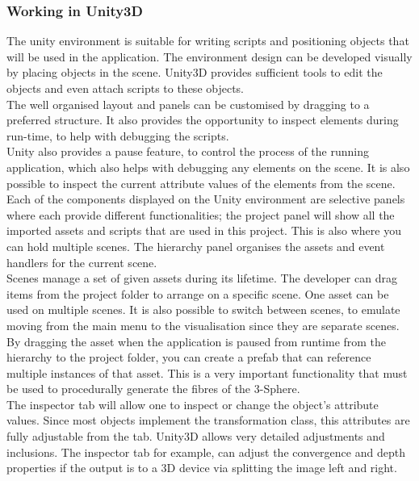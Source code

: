 \documentclass[12pt]{article} %
\begin{document}
\begin{flushleft}
\subsubsection{Working in Unity3D} %
The unity environment is suitable for writing scripts and positioning objects that will be used in the application. The environment design can be developed visually by placing objects in the scene. Unity3D provides sufficient tools to edit the objects and even attach scripts to these objects.  \\
The well organised layout and panels can be customised by dragging to a preferred structure. It also provides the opportunity to inspect elements during run-time, to help with debugging the scripts.\\
Unity also provides a pause feature, to control the process of the running application, which also helps with debugging any elements on the scene. It is also possible to inspect the current attribute values of the elements from the scene.\\
Each of the components displayed on the Unity environment are selective panels where each provide different functionalities; the project panel will show all the imported assets and scripts that are used in this project. This is also where you can hold multiple scenes. The hierarchy panel organises the assets and event handlers for the current scene.\\
Scenes manage a set of given assets during its lifetime. The developer can drag items from the project folder to arrange on a specific scene. One asset can be used on multiple scenes. It is also possible to switch between scenes, to emulate moving from the main menu to the visualisation since they are separate scenes.\\
By dragging the asset when the application is paused from runtime from the hierarchy to the project folder, you can create a prefab that can reference multiple instances of that asset. This is a very important functionality that must be used to procedurally generate the fibres of the 3-Sphere.\\
The inspector tab will allow one to inspect or change the object’s attribute values. Since most objects implement the transformation class, this attributes are fully adjustable from the tab. Unity3D allows very detailed adjustments and inclusions. The inspector tab for example, can adjust the convergence and depth properties if the output is to a 3D device via splitting the image left and right.\\

\end{flushleft}
\end{document}
